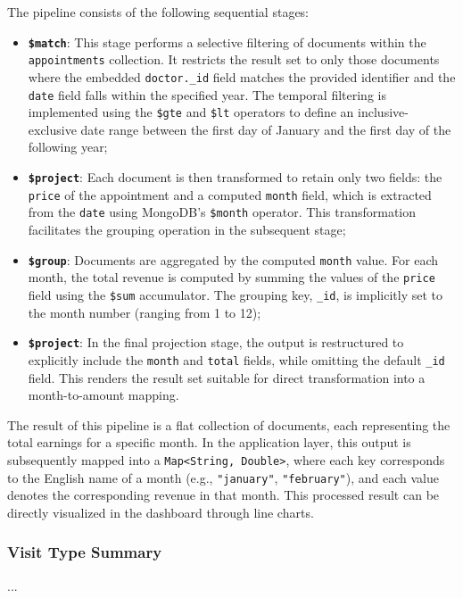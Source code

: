 The pipeline consists of the following sequential stages:

\begin{itemize}
	\item \textbf{\texttt{\$match}}: This stage performs a selective filtering of documents within the \texttt{appointments} collection. It restricts the result set to only those documents where the embedded \texttt{doctor.\_id} field matches the provided identifier and the \texttt{date} field falls within the specified year. The temporal filtering is implemented using the \texttt{\$gte} and \texttt{\$lt} operators to define an inclusive-exclusive date range between the first day of January and the first day of the following year;
	
	\item \textbf{\texttt{\$project}}: Each document is then transformed to retain only two fields: the \texttt{price} of the appointment and a computed \texttt{month} field, which is extracted from the \texttt{date} using MongoDB’s \texttt{\$month} operator. This transformation facilitates the grouping operation in the subsequent stage;
	
	\item \textbf{\texttt{\$group}}: Documents are aggregated by the computed \texttt{month} value. For each month, the total revenue is computed by summing the values of the \texttt{price} field using the \texttt{\$sum} accumulator. The grouping key, \texttt{\_id}, is implicitly set to the month number (ranging from 1 to 12);
	
	\item \textbf{\texttt{\$project}}: In the final projection stage, the output is restructured to explicitly include the \texttt{month} and \texttt{total} fields, while omitting the default \texttt{\_id} field. This renders the result set suitable for direct transformation into a month-to-amount mapping.
\end{itemize}

The result of this pipeline is a flat collection of documents, each representing the total earnings for a specific month. In the application layer, this output is subsequently mapped into a \texttt{Map<String, Double>}, where each key corresponds to the English name of a month (e.g., \texttt{"january"}, \texttt{"february"}), and each value denotes the corresponding revenue in that month. This processed result can be directly visualized in the dashboard through line charts.

\subsubsection{Visit Type Summary}
...

